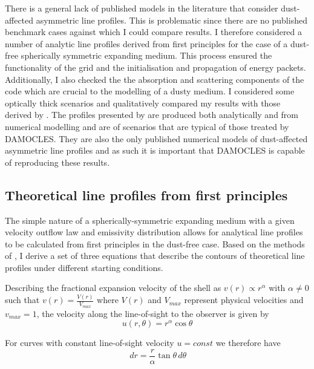 There is a general lack of published models in the literature that consider dust-affected asymmetric line profiles.  This is problematic since there are no published benchmark cases against which I could compare results.  I therefore considered a number of analytic line profiles derived from first principles for the case of a dust-free spherically symmetric expanding medium.  This process ensured the functionality of the grid and the initialisation and propagation of energy packets.  Additionally, I also checked the the absorption and scattering components of the code which are crucial to the modelling of a dusty medium.  I  considered some optically thick scenarios and qualitatively compared my results with those derived by \citet{Lucy1989}.  The profiles presented by  \citet{Lucy1989} are produced both analytically and from numerical modelling and are of scenarios that are typical of those treated by DAMOCLES.  They are also the only published numerical models of dust-affected asymmetric line profiles and as such it is important that DAMOCLES is capable of reproducing these results.

\subsection{Theoretical line profiles from first principles}
\label{analytics}

The simple nature of a spherically-symmetric expanding medium with a given velocity outflow law and emissivity distribution allows for analytical line profiles to be calculated from first principles in the dust-free case.  Based on the methods of \cite{Gerasimovic1933},  I derive a set of three equations that describe the contours of theoretical line profiles under different starting conditions.



Describing the fractional expansion velocity of the shell as $v(r) \propto 
r^\alpha$ with $\alpha \neq 0$ such that $v(r)=\frac{V(r)}{V_{max}}$ where 
$V(r)$ and $V_{max}$ represent physical velocities and $v_{max}=1$, the velocity along the line-of-sight to the observer is given by 
\begin{equation}
\label{eqn:radial_vel}
u(r,\theta)=r^\alpha \cos \theta
\end{equation}

\noindent For curves with constant line-of-sight velocity $u=const$ we therefore have
\begin{equation}
\,d r = \frac{r}{\alpha} \tan \theta \,d \theta
\end{equation}

